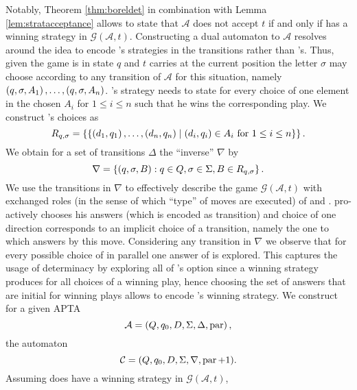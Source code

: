 Notably, Theorem \ref{thm:boreldet} in combination with Lemma
\ref{lem:stratacceptance} allows to state that $\mathcal{A}$ does not accept
$t$ if and only if \adam{} has a winning strategy in
$\mathcal{G}(\mathcal{A},t)$. Constructing a dual automaton to $\mathcal{A}$
resolves around the idea to encode \adam{}'s strategies in the transitions 
rather than \eve{}'s. Thus, given the game is in state $q$ and $t$ carries at 
the current position the letter $\sigma$ \eve{} may choose according to any 
transition of $\mathcal{A}$ for this situation, namely 
$\left(q,\sigma,A_{1}\right),\dots,\left(q,\sigma,A_{n}\right)$. 
\adam{}'s strategy needs to state for every choice of \eve{} one element in the 
chosen $A_{i}$ for $1\leq i\leq n$ such that he wins the corresponding play. We
construct \adam{}'s choices as
\begin{equation*}
  R_{q,\sigma} = \left\{
    \left\{
      \left(d_{1}, q_{1}\right),\dots,\left(d_{n},q_{n}\right)\mid
      \left(d_{i}, q_{i}\right)\in A_{i}\text{ for }1\leq i\leq n
    \right\}
  \right\}.
\end{equation*}
We obtain for a set of transitions $\Delta$ the \enquote{inverse} $\nabla$ by
\begin{equation*}
  \nabla = \left\{
    \left(q, \sigma, B\right):q\in Q, \sigma\in\Sigma, B\in R_{q,\sigma}
  \right\}.
\end{equation*}
We use the transitions in $\nabla$ to effectively describe the game 
$\mathcal{G}(\mathcal{A}, t)$ with exchanged roles (in the sense of which 
\enquote{type} of moves are executed) of \eve{} and \adam{}. \adam{} 
pro-actively chooses his answers (which is encoded as transition) and \eve{} 
choice of one direction corresponds to an implicit choice of a transition, 
namely the one to which \adam{} answers by this move. Considering any 
transition in $\nabla$ we observe that for every possible choice of \eve{} 
in parallel one answer of \adam{} is explored. This captures the usage of
determinacy by exploring all of \adam{}'s option since a winning strategy 
produces for all choices of \eve{} a winning play, hence choosing the set of 
answers that are initial for winning plays allows to encode \adam{}'s winning
strategy. We construct for a given 
\ac{APTA}
\begin{equation*}
  \mathcal{A} = \left(Q, q_{0}, D, \Sigma, \Delta, \operatorname{par}\right),
\end{equation*}
the automaton
\begin{equation*}
  \mathcal{C} = (Q, q_{0}, D, \Sigma, \nabla, \operatorname{par} + 1).
\end{equation*}
Assuming \adam{} does have a winning strategy in $\mathcal{G}(\mathcal{A}, t)$, 

